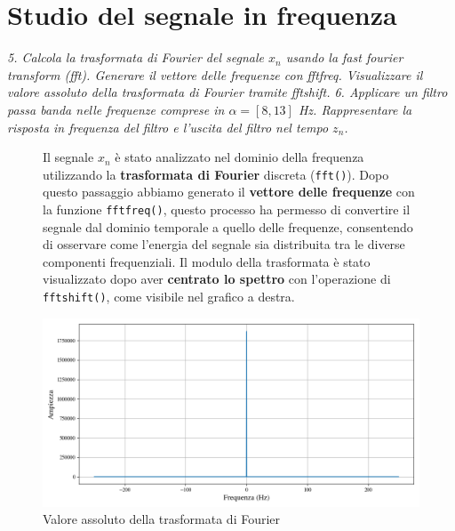 \documentclass{report}
\begin{document}

\section{Studio del segnale in frequenza}

\textit{5. Calcola la trasformata di Fourier del segnale $x_n$ usando la fast fourier transform (fft). Generare il vettore delle frequenze con fftfreq. Visualizzare il valore assoluto della trasformata di Fourier tramite fftshift. 6. Applicare un filtro passa banda nelle frequenze comprese in $\alpha=[8,13]$ Hz. Rappresentare la risposta in frequenza del filtro e l’uscita del filtro nel tempo $z_n$.}

\begin{figure}[!h]
\begin{minipage}{0.4\textwidth}
	Il segnale $x_n$ è stato analizzato nel dominio della frequenza utilizzando la \textbf{trasformata di Fourier} discreta (\texttt{fft()}\footnotemark). Dopo questo passaggio abbiamo generato il \textbf{vettore delle frequenze} con la funzione \texttt{fftfreq()\footnotemark[4]}, questo processo ha permesso di convertire il segnale dal dominio temporale a quello delle frequenze, consentendo di osservare come l’energia del segnale sia distribuita tra le diverse componenti frequenziali. Il modulo della trasformata è stato visualizzato dopo aver \textbf{centrato lo spettro} con l’operazione di \texttt{fftshift()}\footnotemark[4], come visibile nel grafico a destra.
\end{minipage}
\hfill
\hspace{0.5cm}
\begin{minipage}{0.55\textwidth}
\centering
\includegraphics[width=\textwidth]{plot3}
\caption{Valore assoluto della trasformata di Fourier}    
\end{minipage}
\end{figure}
\end{document}
